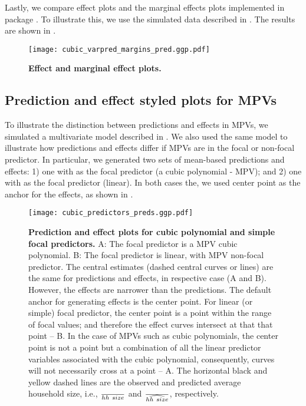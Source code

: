 Lastly, we compare effect plots and the marginal effects \citep{leeper2017interpreting} plots implemented in package  \citep{lenth2018package}. To illustrate this, we use the simulated data described in . The results are shown in .
%
\begin{figure}
\centering
\texttt{[image: cubic\_varpred\_margins\_pred.ggp.pdf]}
\caption{{\bf Effect and marginal effect plots.} }
\label{fig:qoi_age_pred_plot}
\end{figure}
%


\subsection{Prediction and effect styled plots for MPVs}

To illustrate the distinction between predictions and effects in MPVs, we simulated a multivariate model described in . We also used the same model to illustrate how predictions and effects differ if MPVs are in the focal or non-focal predictor. In particular, we generated two sets of mean-based predictions and effects: 1) one with  as the focal predictor (a cubic polynomial - MPV); and 2) one with  as the focal predictor (linear). In both cases the, we used center point as the anchor for the effects, as shown in .

\begin{figure}
\begin{center}
\texttt{[image: cubic\_predictors\_preds.ggp.pdf]}
\end{center}
\caption{{\bf Prediction and effect plots for cubic polynomial and simple focal predictors.} A: The focal predictor is a MPV cubic polynomial. B: The focal predictor is linear, with MPV non-focal predictor. The central estimates (dashed central curves or lines) are the same for predictions and effects, in respective case (A and B). However, the effects are narrower than the predictions. The default anchor for generating effects is the center point. For linear (or simple) focal predictor, the center point is a point within the range of focal values; and therefore the effect curves intersect at that that point -- B. In the case of MPVs such as cubic polynomials, the center point is not a point but a combination of all the linear predictor variables associated with the cubic polynomial, consequently, curves will not necessarily cross at a point -- A. The horizontal black and yellow dashed lines are the observed and predicted average household size, i.e., $\over{hh~size}$ and $\over{\widehat{hh~size}}$, respectively.}
\label{fig:pred_cubic_plots}
\end{figure}

